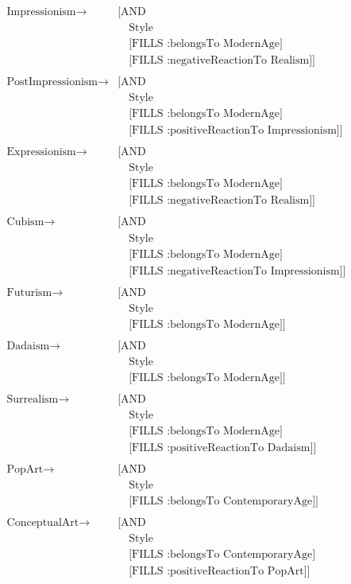 \begin{align*}
      \text{Impressionism} \to& \text{[AND}\\
      &\quad\text{Style}\\
      &\quad\text{[FILLS :belongsTo ModernAge]}\\
      &\quad\text{[FILLS :negativeReactionTo Realism]]}\\\\
      \text{PostImpressionism} \to& \text{[AND}\\
      &\quad\text{Style}\\
      &\quad\text{[FILLS :belongsTo ModernAge]}\\
      &\quad\text{[FILLS :positiveReactionTo Impressionism]]}\\\\
      \text{Expressionism} \to& \text{[AND}\\
      &\quad\text{Style}\\
      &\quad\text{[FILLS :belongsTo ModernAge]}\\
      &\quad\text{[FILLS :negativeReactionTo Realism]]}\\\\
      \text{Cubism} \to& \text{[AND}\\
      &\quad\text{Style}\\
      &\quad\text{[FILLS :belongsTo ModernAge]}\\
      &\quad\text{[FILLS :negativeReactionTo Impressionism]]}\\\\
      \text{Futurism} \to& \text{[AND}\\
      &\quad\text{Style}\\
      &\quad\text{[FILLS :belongsTo ModernAge]]}\\\\
      \text{Dadaism} \to& \text{[AND}\\
      &\quad\text{Style}\\
      &\quad\text{[FILLS :belongsTo ModernAge]]}\\\\
      \text{Surrealism} \to& \text{[AND}\\
      &\quad\text{Style}\\
      &\quad\text{[FILLS :belongsTo ModernAge]}\\
      &\quad\text{[FILLS :positiveReactionTo Dadaism]]}\\\\
      \text{PopArt} \to& \text{[AND}\\
      &\quad\text{Style}\\
      &\quad\text{[FILLS :belongsTo ContemporaryAge]]}\\\\
      \text{ConceptualArt} \to& \text{[AND}\\
      &\quad\text{Style}\\
      &\quad\text{[FILLS :belongsTo ContemporaryAge]}\\
      &\quad\text{[FILLS :positiveReactionTo PopArt]]}
    \end{align*}
